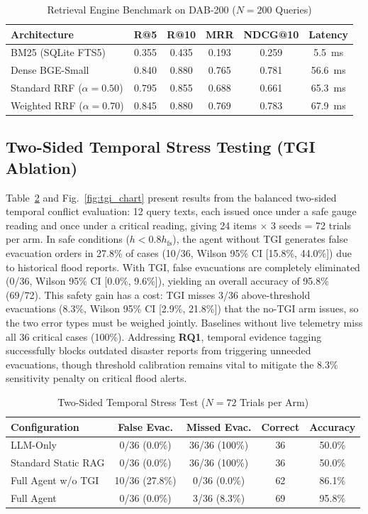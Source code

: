 \documentclass[conference]{IEEEtran}
\begin{document}
\begin{table}[h]
\caption{Retrieval Engine Benchmark on DAB-200 ($N=200$ Queries)}
\label{tab:retrieval}
\centering
\scriptsize
\setlength{\tabcolsep}{2pt}
\begin{tabular*}{\columnwidth}{@{\extracolsep{\fill}}lccccc@{}}
\toprule
Architecture & R@5 & R@10 & MRR & NDCG@10 & Latency \\
\midrule
BM25 (SQLite FTS5) & 0.355 & 0.435 & 0.193 & 0.259 & 5.5~ms \\
Dense BGE-Small & 0.840 & 0.880 & 0.765 & 0.781 & 56.6~ms \\
Standard RRF ($\alpha=0.50$) & 0.795 & 0.855 & 0.688 & 0.661 & 65.3~ms \\
\midrule
Weighted RRF ($\alpha=0.70$) & 0.845 & 0.880 & 0.769 & 0.783 & 67.9~ms \\
\bottomrule
\end{tabular*}
\end{table}

\subsection{Two-Sided Temporal Stress Testing (TGI Ablation)}
Table~\ref{tab:tgi} and Fig.~\ref{fig:tgi_chart} present results from the balanced two-sided temporal conflict evaluation: 12 query texts, each issued once under a safe gauge reading and once under a critical reading, giving 24 items $\times$ 3 seeds = 72 trials per arm. In safe conditions ($h < 0.8 h_{\mathrm{fs}}$), the agent without TGI generates false evacuation orders in 27.8\% of cases (10/36, Wilson 95\% CI [15.8\%, 44.0\%]) due to historical flood reports. With TGI, false evacuations are completely eliminated (0/36, Wilson 95\% CI [0.0\%, 9.6\%]), yielding an overall accuracy of 95.8\% (69/72). This safety gain has a cost: TGI misses 3/36 above-threshold evacuations (8.3\%, Wilson 95\% CI [2.9\%, 21.8\%]) that the no-TGI arm issues, so the two error types must be weighed jointly. Baselines without live telemetry miss all 36 critical cases (100\%). Addressing \textbf{RQ1}, temporal evidence tagging successfully blocks outdated disaster reports from triggering unneeded evacuations, though threshold calibration remains vital to mitigate the 8.3\% sensitivity penalty on critical flood alerts.

\begin{table}[h]
\caption{Two-Sided Temporal Stress Test ($N=72$ Trials per Arm)}
\label{tab:tgi}
\centering
\scriptsize
\setlength{\tabcolsep}{2pt}
\begin{tabular*}{\columnwidth}{@{\extracolsep{\fill}}lcccc@{}}
\toprule
Configuration & False Evac. & Missed Evac. & Correct & Accuracy \\
\midrule
LLM-Only & 0/36 (0.0\%) & 36/36 (100\%) & 36 & 50.0\% \\
Standard Static RAG & 0/36 (0.0\%) & 36/36 (100\%) & 36 & 50.0\% \\
Full Agent w/o TGI & 10/36 (27.8\%) & 0/36 (0.0\%) & 62 & 86.1\% \\
Full Agent & 0/36 (0.0\%) & 3/36 (8.3\%) & 69 & 95.8\% \\
\bottomrule
\end{tabular*}
\end{table}
\end{document}
